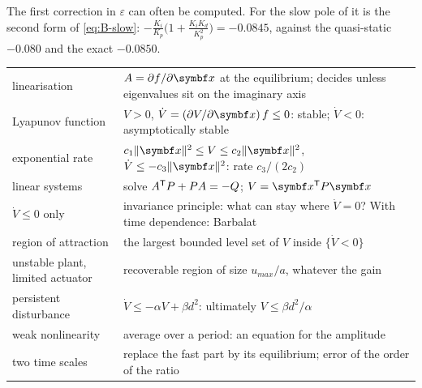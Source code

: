 The first correction in $\varepsilon$ can often be computed. For the slow pole of  it is the second form of \cref{eq:B-slow}: $-\tfrac{K_i}{K_p}\big(1 + \tfrac{K_iK_d}{K_p^2}\big) = -0.0845$, against the quasi-static $-0.080$ and the exact $-0.0850$.

\begin{result}
\begin{center}\small
\renewcommand{\arraystretch}{1.4}
\begin{tabularx}{\linewidth}{@{}l>{\raggedright\arraybackslash}X@{}}
linearisation & $A = \partial f/\partial\vx$ at the equilibrium; decides unless eigenvalues sit on the imaginary axis\\
Lyapunov function & $V > 0$, $\dot V = (\partial V/\partial\vx)\,f \le 0$: stable; $\dot V < 0$: asymptotically stable\\
exponential rate & $c_1\|\vx\|^2 \le V \le c_2\|\vx\|^2$, $\dot V \le -c_3\|\vx\|^2$: rate $c_3/(2c_2)$\\
linear systems & solve $A^{\mathsf{T}} P + PA = -Q$; $V = \vx^\T P\vx$\\
$\dot V \le 0$ only & invariance principle: what can stay where $\dot V = 0$? With time dependence: Barbalat\\
region of attraction & the largest bounded level set of $V$ inside $\{\dot V < 0\}$\\
unstable plant, limited actuator & recoverable region of size $u_{max}/a$, whatever the gain\\
persistent disturbance & $\dot V \le -\alpha V + \beta d^2$: ultimately $V \le \beta d^2/\alpha$\\
weak nonlinearity & average over a period: an equation for the amplitude\\
two time scales & replace the fast part by its equilibrium; error of the order of the ratio\\
\end{tabularx}
\end{center}
\end{result}
